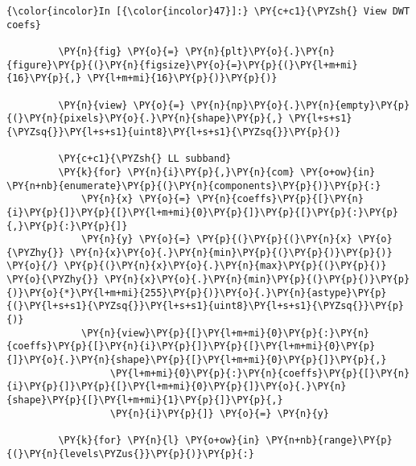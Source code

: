     \begin{Verbatim}[commandchars=\\\{\}]
{\color{incolor}In [{\color{incolor}47}]:} \PY{c+c1}{\PYZsh{} View DWT coefs}
         
         \PY{n}{fig} \PY{o}{=} \PY{n}{plt}\PY{o}{.}\PY{n}{figure}\PY{p}{(}\PY{n}{figsize}\PY{o}{=}\PY{p}{(}\PY{l+m+mi}{16}\PY{p}{,} \PY{l+m+mi}{16}\PY{p}{)}\PY{p}{)}
         
         \PY{n}{view} \PY{o}{=} \PY{n}{np}\PY{o}{.}\PY{n}{empty}\PY{p}{(}\PY{n}{pixels}\PY{o}{.}\PY{n}{shape}\PY{p}{,} \PY{l+s+s1}{\PYZsq{}}\PY{l+s+s1}{uint8}\PY{l+s+s1}{\PYZsq{}}\PY{p}{)}
         
         \PY{c+c1}{\PYZsh{} LL subband}
         \PY{k}{for} \PY{n}{i}\PY{p}{,}\PY{n}{com} \PY{o+ow}{in} \PY{n+nb}{enumerate}\PY{p}{(}\PY{n}{components}\PY{p}{)}\PY{p}{:}
             \PY{n}{x} \PY{o}{=} \PY{n}{coeffs}\PY{p}{[}\PY{n}{i}\PY{p}{]}\PY{p}{[}\PY{l+m+mi}{0}\PY{p}{]}\PY{p}{[}\PY{p}{:}\PY{p}{,}\PY{p}{:}\PY{p}{]}
             \PY{n}{y} \PY{o}{=} \PY{p}{(}\PY{p}{(}\PY{n}{x} \PY{o}{\PYZhy{}} \PY{n}{x}\PY{o}{.}\PY{n}{min}\PY{p}{(}\PY{p}{)}\PY{p}{)} \PY{o}{/} \PY{p}{(}\PY{n}{x}\PY{o}{.}\PY{n}{max}\PY{p}{(}\PY{p}{)} \PY{o}{\PYZhy{}} \PY{n}{x}\PY{o}{.}\PY{n}{min}\PY{p}{(}\PY{p}{)}\PY{p}{)}\PY{o}{*}\PY{l+m+mi}{255}\PY{p}{)}\PY{o}{.}\PY{n}{astype}\PY{p}{(}\PY{l+s+s1}{\PYZsq{}}\PY{l+s+s1}{uint8}\PY{l+s+s1}{\PYZsq{}}\PY{p}{)}
             \PY{n}{view}\PY{p}{[}\PY{l+m+mi}{0}\PY{p}{:}\PY{n}{coeffs}\PY{p}{[}\PY{n}{i}\PY{p}{]}\PY{p}{[}\PY{l+m+mi}{0}\PY{p}{]}\PY{o}{.}\PY{n}{shape}\PY{p}{[}\PY{l+m+mi}{0}\PY{p}{]}\PY{p}{,}
                  \PY{l+m+mi}{0}\PY{p}{:}\PY{n}{coeffs}\PY{p}{[}\PY{n}{i}\PY{p}{]}\PY{p}{[}\PY{l+m+mi}{0}\PY{p}{]}\PY{o}{.}\PY{n}{shape}\PY{p}{[}\PY{l+m+mi}{1}\PY{p}{]}\PY{p}{,}
                  \PY{n}{i}\PY{p}{]} \PY{o}{=} \PY{n}{y}
         
         \PY{k}{for} \PY{n}{l} \PY{o+ow}{in} \PY{n+nb}{range}\PY{p}{(}\PY{n}{levels\PYZus{}}\PY{p}{)}\PY{p}{:}
         

\end{Verbatim}
